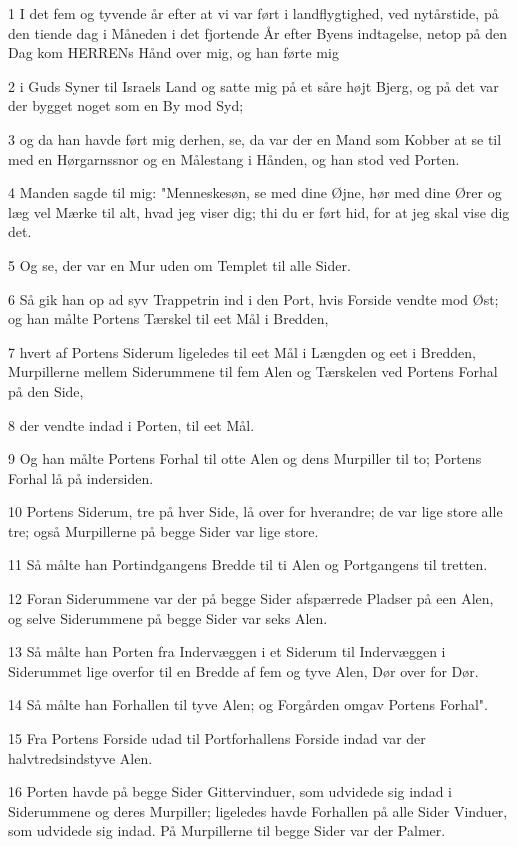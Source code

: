 \par 1 I det fem og tyvende år efter at vi var ført i landflygtighed, ved nytårstide, på den tiende dag i Måneden i det fjortende År efter Byens indtagelse, netop på den Dag kom HERRENs Hånd over mig, og han førte mig
\par 2 i Guds Syner til Israels Land og satte mig på et såre højt Bjerg, og på det var der bygget noget som en By mod Syd;
\par 3 og da han havde ført mig derhen, se, da var der en Mand som Kobber at se til med en Hørgarnssnor og en Målestang i Hånden, og han stod ved Porten.
\par 4 Manden sagde til mig: "Menneskesøn, se med dine Øjne, hør med dine Ører og læg vel Mærke til alt, hvad jeg viser dig; thi du er ført hid, for at jeg skal vise dig det.
\par 5 Og se, der var en Mur uden om Templet til alle Sider.
\par 6 Så gik han op ad syv Trappetrin ind i den Port, hvis Forside vendte mod Øst; og han målte Portens Tærskel til eet Mål i Bredden,
\par 7 hvert af Portens Siderum ligeledes til eet Mål i Længden og eet i Bredden, Murpillerne mellem Siderummene til fem Alen og Tærskelen ved Portens Forhal på den Side,
\par 8 der vendte indad i Porten, til eet Mål.
\par 9 Og han målte Portens Forhal til otte Alen og dens Murpiller til to; Portens Forhal lå på indersiden.
\par 10 Portens Siderum, tre på hver Side, lå over for hverandre; de var lige store alle tre; også Murpillerne på begge Sider var lige store.
\par 11 Så målte han Portindgangens Bredde til ti Alen og Portgangens til tretten.
\par 12 Foran Siderummene var der på begge Sider afspærrede Pladser på een Alen, og selve Siderummene på begge Sider var seks Alen.
\par 13 Så målte han Porten fra Indervæggen i et Siderum til Indervæggen i Siderummet lige overfor til en Bredde af fem og tyve Alen, Dør over for Dør.
\par 14 Så målte han Forhallen til tyve Alen; og Forgården omgav Portens Forhal".
\par 15 Fra Portens Forside udad til Portforhallens Forside indad var der halvtredsindstyve Alen.
\par 16 Porten havde på begge Sider Gittervinduer, som udvidede sig indad i Siderummene og deres Murpiller; ligeledes havde Forhallen på alle Sider Vinduer, som udvidede sig indad. På Murpillerne til begge Sider var der Palmer.
